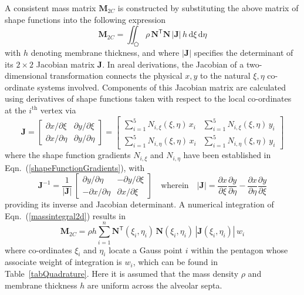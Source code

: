 A consistent mass matrix $\mathbf{M}_{2C}$ is constructed by substituting the above matrix of shape functions into the following expression
\begin{equation}
\mathbf{M}_{2C} = \iint_{\pentagon} \rho \, \mathbf{N}^{\mathsf{T}} \mathbf{N} \,|\mathbf{J}| \, h \, \mathrm{d} \xi \, \mathrm{d} \eta
\label{massintegral2d}
\end{equation}
with $h$ denoting membrane thickness, and where $|\mathbf{J}|$ specifies the determinant of its $2 \! \times \! 2$ Jacobian matrix $\mathbf{J}$.  In areal derivations, the Jacobian of a two-dimensional transformation connects the physical ${x, y}$ to the natural ${\xi, \eta}$ co-ordinate systems involved.  Components of this Jacobian matrix are calculated using derivatives of shape functions taken with respect to the local co-ordinates at the $i^{\mathrm{th}}$ vertex via
\begin{equation}
\mathbf{J} = 
\begin{bmatrix}
\partial x / \partial\xi & \partial y / \partial\xi \\
\partial x / \partial\eta & \partial y / \partial\eta 
\end{bmatrix}  
= \begin{bmatrix}
\sum\nolimits_{i=1}^5 N_{i,\xi} (\xi,\eta) \, x_i & \sum\nolimits_{i=1}^5 N_{i,\xi} (\xi,\eta) \, y_i \\
\sum\nolimits_{i=1}^5 N_{i,\eta} (\xi,\eta) \, x_i & \sum\nolimits_{i=1}^5 N_{i,\eta} (\xi,\eta) \, y_i
\end{bmatrix}
\end{equation}
where the shape function gradients $N_{i,\xi}$ and $N_{i,\eta}$ have been established in Eqn.~(\ref{shapeFunctionGradients}), with
\begin{equation}
\mathbf{J}^{-1}  = \frac{1}{|\mathbf{J}|} \,
\begin{bmatrix}
\partial y / \partial\eta & - \partial y / \partial\xi \\
- \partial x / \partial\eta & \partial x / \partial\xi
\end{bmatrix} 
\quad \text{wherein} \quad 
| \mathbf{J} | = \frac{\partial x}{\partial \xi} \frac{\partial y}{\partial \eta} - 
\frac{\partial x}{\partial \eta} \frac{\partial y}{\partial \xi}
\label{jacobianpent}
\end{equation}
providing its inverse and Jacobian determinant.  A numerical integration of Eqn.~(\ref{massintegral2d}) results in 
\begin{equation}
\mathbf{M}_{2C} = \rho h \sum_{i=1}^{n} \mathbf{N}^{\mathsf{T}} ( \xi_i , \eta_i ) \, \mathbf{N} ( \xi_i , \eta_i ) \,|\mathbf{J} ( \xi_i , \eta_i ) | \, w_i
\end{equation}
where co-ordinates $\xi_i$ and $\eta_i$ locate a Gauss point $i$ within the pentagon whose associate weight of integration is $w_i$, which can be found in Table~\ref{tabQuadrature}.  Here it is assumed that the mass density $\rho$ and membrane thickness $h$ are uniform across the alveolar septa.

